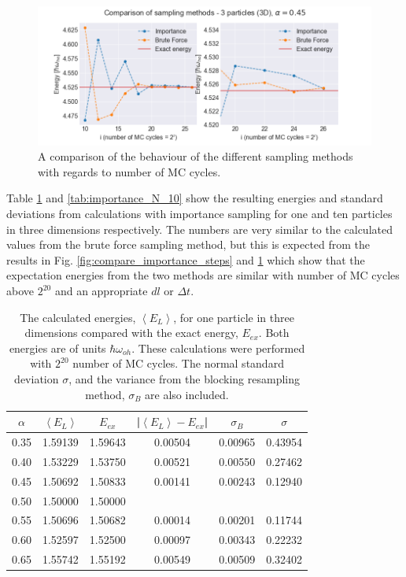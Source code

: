 \begin{figure}[H]
\center
\includegraphics[width=\linewidth]{../Results/comparison_MC_importance}\caption{A comparison of the behaviour of the different sampling methods with regards to number of MC cycles.}\label{fig:compare_importance_MC}
\end{figure}

Table \ref{tab:importance_N_1} and \ref{tab:importance_N_10} show the resulting energies and standard deviations from calculations with importance sampling for one and ten particles in three dimensions respectively. The numbers are very similar to the calculated values from the brute force sampling method, but this is expected from the results in Fig. \ref{fig:compare_importance_steps} and \ref{fig:compare_importance_MC} which show that the expectation energies from the two methods are similar with number of MC cycles above $2^{20}$ and an appropriate $dl$ or $\Delta t$. 

\begin{table}[H]\caption{The calculated energies, $\left<E_L\right>$, for one particle in three dimensions compared with the exact energy, $E_{ex}$. Both energies are of units $\hbar\omega_{oh}$. These calculations were performed with $2^{20}$ number of MC cycles. The normal standard deviation $\sigma$, and the variance from the blocking resampling method, $\sigma_B$ are also included. }\label{tab:importance_N_1}
\center
\begin{tabular}{cccccc}
$\alpha$ & $\left< E_L \right>$ & $E_{ex}$ & |$\left< E_L \right>-E_{ex}$|  & $\sigma_B$ & $\sigma$\\ \hline
0.35 & 1.59139 & 1.59643 & 0.00504 & 0.00965 & 0.43954\\
0.40 & 1.53229 & 1.53750 & 0.00521 & 0.00550 & 0.27462\\
0.45 & 1.50692 & 1.50833 & 0.00141 & 0.00243 & 0.12940\\
0.50 & 1.50000 & 1.50000 &                &                &                 \\
0.55 & 1.50696 & 1.50682 & 0.00014 & 0.00201 & 0.11744\\
0.60 & 1.52597 & 1.52500 & 0.00097 & 0.00343 & 0.22232\\
0.65 & 1.55742 & 1.55192 & 0.00549 & 0.00509 & 0.32402\\
\end{tabular}
\end{table} 

